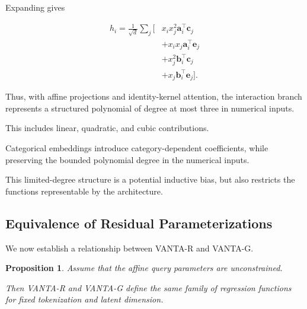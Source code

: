 \documentclass[11pt,a4paper]{article}
\newtheorem{proposition}{Proposition}
\begin{document}
Expanding gives

\begin{align}
h_i=\frac{1}{\sqrt d}\sum_j
\Big[
&
x_ix_j^2\mathbf{a}_i^\top\mathbf{c}_j
\nonumber\\
&+
x_ix_j\mathbf{a}_i^\top\mathbf{e}_j
\nonumber\\
&+
x_j^2\mathbf{b}_i^\top\mathbf{c}_j
\nonumber\\
&+
x_j\mathbf{b}_i^\top\mathbf{e}_j
\Big].
\end{align}

Thus, with affine projections and
identity-kernel attention, the interaction
branch represents a structured polynomial
of degree at most three in numerical inputs.

This includes linear, quadratic, and
cubic contributions.

Categorical embeddings introduce
category-dependent coefficients, while
preserving the bounded polynomial degree
in the numerical inputs.

This limited-degree structure is a
potential inductive bias, but also
restricts the functions representable
by the architecture.

\subsection{Equivalence of Residual Parameterizations}

We now establish a relationship between
VANTA-R and VANTA-G.

\begin{proposition}
Assume that the affine query parameters
are unconstrained.

Then VANTA-R and VANTA-G define the same
family of regression functions for
fixed tokenization and latent dimension.
\end{proposition}
\end{document}
